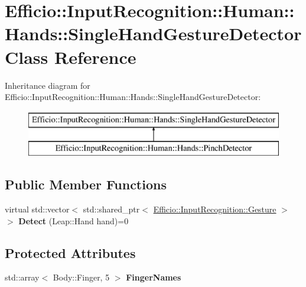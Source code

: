 \hypertarget{class_efficio_1_1_input_recognition_1_1_human_1_1_hands_1_1_single_hand_gesture_detector}{}\section{Efficio\+:\+:Input\+Recognition\+:\+:Human\+:\+:Hands\+:\+:Single\+Hand\+Gesture\+Detector Class Reference}
\label{class_efficio_1_1_input_recognition_1_1_human_1_1_hands_1_1_single_hand_gesture_detector}
Inheritance diagram for Efficio\+:\+:Input\+Recognition\+:\+:Human\+:\+:Hands\+:\+:Single\+Hand\+Gesture\+Detector\+:\begin{figure}[H]
\begin{center}
\leavevmode
\includegraphics[height=2.000000cm]{class_efficio_1_1_input_recognition_1_1_human_1_1_hands_1_1_single_hand_gesture_detector}
\end{center}
\end{figure}
\subsection*{Public Member Functions}
\begin{DoxyCompactItemize}
\item 
\hypertarget{class_efficio_1_1_input_recognition_1_1_human_1_1_hands_1_1_single_hand_gesture_detector_a6fb83b598c1f11539f6c49495c987994}{}\label{class_efficio_1_1_input_recognition_1_1_human_1_1_hands_1_1_single_hand_gesture_detector_a6fb83b598c1f11539f6c49495c987994} 
virtual std\+::vector$<$ std\+::shared\+\_\+ptr$<$ \hyperlink{class_efficio_1_1_input_recognition_1_1_gesture}{Efficio\+::\+Input\+Recognition\+::\+Gesture} $>$ $>$ {\bfseries Detect} (Leap\+::\+Hand hand)=0
\end{DoxyCompactItemize}
\subsection*{Protected Attributes}
\begin{DoxyCompactItemize}
\item 
std\+::array$<$ Body\+::\+Finger, 5 $>$ {\bfseries Finger\+Names}
\end{DoxyCompactItemize}


